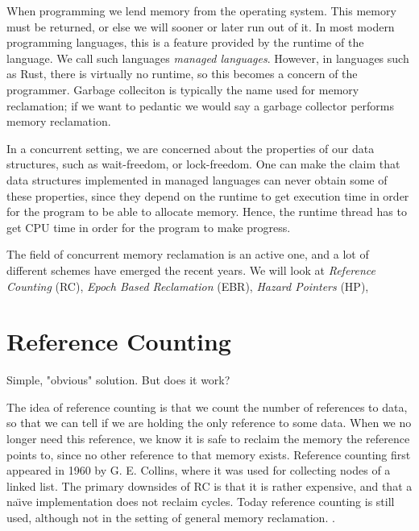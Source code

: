 \documentclass[b5paper,twoside]{report}
\begin{document}
When programming we lend memory from the operating system. This memory must be returned, or else
we will sooner or later run out of it.
In most modern programming languages, this is a feature provided by the runtime of the language.
We call such languages \emph{managed languages}.
However, in languages such as Rust, there is virtually no runtime, so this becomes a concern
of the programmer.
Garbage colleciton is typically the name used for memory reclamation;
if we want to pedantic we would say a garbage collector performs memory reclamation.

In a concurrent setting, we are concerned about the properties of our data structures,
such as wait-freedom, or lock-freedom.
One can make the claim that data structures implemented in managed languages can never
obtain some of these properties, since they depend on the runtime to get execution time
in order for the program to be able to allocate memory.
Hence, the runtime thread has to get CPU time in order for the program to make progress.

The field of concurrent memory reclamation is an active one, and a lot of different schemes
have emerged the recent years. We will look at
\emph{Reference Counting} (RC),
\emph{Epoch Based Reclamation} (EBR),
\emph{Hazard Pointers} (HP),




\section{Reference Counting}
Simple, "obvious" solution. But does it work?

The idea of reference counting is that we count the number of references to data,
so that we can tell if we are holding the only reference to some data.
When we no longer need this reference, we know it is safe to reclaim the memory
the reference points to, since no other reference to that memory exists.
Reference counting first appeared in 1960 by G. E. Collins\cite{collins1960method},
where it was used for collecting nodes of a linked list.
The primary downsides of RC is that it is rather expensive, and that a na\"\i{}ve
implementation does not reclaim cycles.
Today reference counting is still used, although not in the setting of general
memory reclamation. 
.
\end{document}
